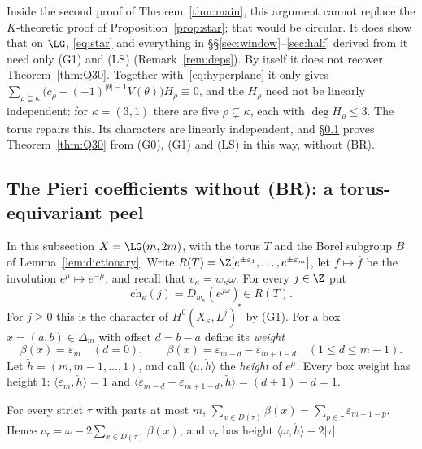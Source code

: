 Inside the second proof of Theorem~\ref{thm:main}, this argument cannot replace the
$K$-theoretic proof of Proposition~\ref{prop:star}; that would be circular. It does show that on $\LG$, \eqref{eq:star} and everything in
\S\S\ref{sec:window}--\ref{sec:half} derived from it need only (G1) and (LS)
(Remark~\ref{rem:deps}). By itself it does not recover Theorem~\ref{thm:Q30}. Together with~\eqref{eq:hyperplane}
it only gives $\sum_{\rho\subsetneq\kappa}\bigl(c_\rho-(-1)^{|\theta|-1}V(\theta)\bigr)H_\rho\equiv0$, and
the $H_\rho$ need not be linearly independent: for $\kappa=(3,1)$ there are five
$\rho\subsetneq\kappa$, each with $\deg H_\rho\le3$. The torus repairs this. Its characters
are linearly independent, and \S\ref{ssec:equivariant} proves Theorem~\ref{thm:Q30} from (G0), (G1) and (LS)
in this way, without (BR).

\subsection{The Pieri coefficients without (BR): a torus-equivariant peel}\label{ssec:equivariant}
In this subsection $X=\LG(m,2m)$, with the torus $T$ and the Borel subgroup $B$ of
Lemma~\ref{lem:dictionary}. Write $R(T)=\Z[e^{\pm\varepsilon_1},\dots,e^{\pm\varepsilon_m}]$, let
$f\mapsto\overline f$ be the involution $e^\mu\mapsto e^{-\mu}$, and recall that
$v_\kappa=w_\kappa\omega$. For every $j\in\Z$ put
\[ \mathrm{ch}_\kappa(j)=D_{w_\kappa}(e^{j\omega})\in R(T). \]
For $j\ge0$ this is the character of $H^0(X_\kappa,L^j)^*$ by (G1). For a box $x=(a,b)\in\Delta_m$
with offset $d=b-a$ define its \emph{weight}
\[ \beta(x)=\varepsilon_m\quad(d=0),\qquad \beta(x)=\varepsilon_{m-d}-\varepsilon_{m+1-d}\quad(1\le d\le m-1). \]
Let $\check h=(m,m-1,\dots,1)$, and call $\langle\mu,\check h\rangle$ the \emph{height} of $e^\mu$.
Every box weight has height $1$: $\langle\varepsilon_m,\check h\rangle=1$ and
$\langle\varepsilon_{m-d}-\varepsilon_{m+1-d},\check h\rangle=(d+1)-d=1$.

\begin{lemma}[Telescoping]\label{lem:telescope}
For every strict $\tau$ with parts at most $m$,
$\sum_{x\in D(\tau)}\beta(x)=\sum_{p\in\tau}\varepsilon_{m+1-p}$. Hence
$v_\tau=\omega-2\sum_{x\in D(\tau)}\beta(x)$, and $v_\tau$ has height $\langle\omega,\check h\rangle-2|\tau|$.
\end{lemma}

